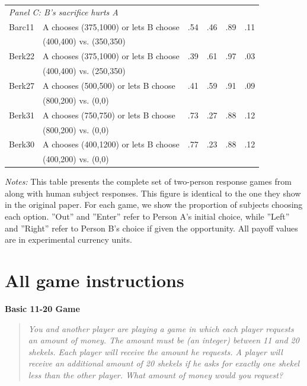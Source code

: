 \documentclass[11pt]{article}
\theoremstyle{definition}
\begin{document}
\begin{table}[h!]
\begin{center}
\begin{tabular}{llcccc}
\multicolumn{6}{l}{\textit{Panel C: B's sacrifice hurts A}} \\[0.5ex]
Barc11 & A chooses (375,1000) or lets B choose & .54 & .46 & .89 & .11 \\
& (400,400) vs. (350,350) & & & & \\
Berk22 & A chooses (375,1000) or lets B choose & .39 & .61 & .97 & .03 \\
& (400,400) vs. (250,350) & & & & \\
Berk27 & A chooses (500,500) or lets B choose & .41 & .59 & .91 & .09 \\
& (800,200) vs. (0,0) & & & & \\
Berk31 & A chooses (750,750) or lets B choose & .73 & .27 & .88 & .12 \\
& (800,200) vs. (0,0) & & & & \\
Berk30 & A chooses (400,1200) or lets B choose & .77 & .23 & .88 & .12 \\
& (400,200) vs. (0,0) & & & & \\
\hline
\end{tabular}
\end{center}
\begin{footnotesize}
\begin{singlespace}
\vspace*{-0.05in}
\textit{Notes:} This table presents the complete set of two-person response games from \citeauthor{charness2002understanding} along with human subject responses. 
This figure is identical to the one they show in the original paper.
For each game, we show the proportion of subjects choosing each option. ''Out'' and ''Enter'' refer to Person A's initial choice, while ''Left'' and ''Right'' refer to Person B's choice if given the opportunity. All payoff values are in experimental currency units.
\end{singlespace}
\end{footnotesize}
\end{table}
  
\newpage \clearpage

\renewcommand{\thefigure}{B\arabic{figure}} 
\setcounter{figure}{0}  

\renewcommand{\thetable}{B\arabic{table}} 
\setcounter{table}{0}  


\section{All game instructions}
\label{app:instruct}

\noindent\textbf{Basic 11-20 Game}
\begin{quote}
\emph{You and another player are playing a game in which each player requests an amount of money. The amount must be (an integer) between 11 and 20 shekels.  Each player will receive the amount he requests. A player will receive an additional amount of 20 shekels if he asks for exactly one shekel less than the other player. What amount of money would you request?}
\end{quote}
\end{document}
